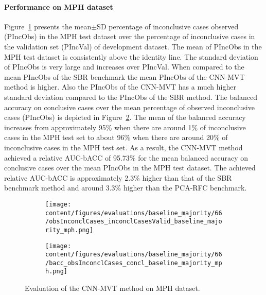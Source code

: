 
\paragraph{Performance on MPH dataset}

Figure~\ref{fig:obsInconclCases_inconclCasesValid_baseline_majority_mph} presents
the mean$\pm$SD percentage of inconclusive cases observed (PIncObs) in the MPH test dataset 
over the percentage of inconclusive cases in the validation set (PIncVal) of development dataset.
The mean of PIncObs in the MPH test dataset is consistently above the identity line.
The standard deviation of PIncObs is very large and increases over PIncVal.
When compared to the mean PIncObs of the SBR benchmark the mean PIncObs of the CNN-MVT method is higher.
Also the PIncObs of the CNN-MVT has a much higher standard deviation compared to the PIncObs of the SBR method.
The balanced accuracy on conclusive cases over the mean percentage of observed inconclusive cases (PIncObs) is depicted 
in Figure~\ref{fig:bacc_obsInconclCases_concl_baseline_majority_mph}.
The mean of the balanced accuracy increases from approximately 95\% 
when there are around 1\% of inconclusive cases in the MPH test set to about 96\% 
when there are around 20\% of inconclusive cases in the MPH test set.
As a result, the CNN-MVT method achieved a relative AUC-bACC of 95.73\% for the mean balanced accuracy on conclusive cases 
over the mean PIncObs in the MPH test dataset.
The achieved relative AUC-bACC is approximately 2.3\% higher than that of the SBR benchmark method 
and around 3.3\% higher than the PCA-RFC benchmark.


\begin{figure}[ht]
  \begin{subfigure}{0.49\textwidth}
    \centering
    \texttt{[image: content/figures/evaluations/baseline\_majority/66/obsInconclCases\_inconclCasesValid\_baseline\_majority\_mph.png]}
    \label{fig:obsInconclCases_inconclCasesValid_baseline_majority_mph}
  \end{subfigure}
  \hfill
  \begin{subfigure}{0.49\textwidth}
    \centering
    \texttt{[image: content/figures/evaluations/baseline\_majority/66/bacc\_obsInconclCases\_concl\_baseline\_majority\_mph.png]}
    \label{fig:bacc_obsInconclCases_concl_baseline_majority_mph}
  \end{subfigure}
  \caption{Evaluation of the CNN-MVT method on MPH dataset.}
  \label{fig:perf_results_mvt_mph}
\end{figure}


